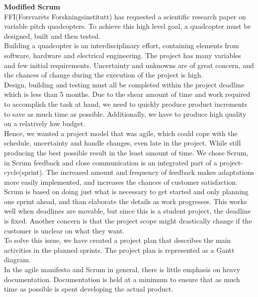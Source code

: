 \textbf{\LARGE Modified Scrum} \\
FFI(Forsvarets Forskningsinstitutt) has requested a scientific research paper on variable pitch quadcopters. To achieve this high level goal, a quadcopter must be designed, built and then tested.\\

Building a quadcopter is an interdisciplinary effort, containing elements from software, hardware and electrical engineering. The project has many variables and few initial requirements. Uncertainty and unknowns are of great concern, and the chances of change during the execution of the project is high. \\

Design, building and testing must all be completed within the project deadline which is less than 5 months. Due to the shear amount of time and work required to accomplish the task at hand, we need to quickly produce product increments to save as much time as possible. Additionally, we have to produce high quality on a relatively low budget.\\

Hence, we wanted a project model that was agile, which could cope with the schedule, uncertainty and handle changes, even late in the project. While still producing the best possible result in the least amount of time. We chose Scrum, in Scrum feedback and close communication is an integrated part of a project- cycle(sprint). The increased amount and frequency of feedback makes adaptations more easily implemented, and increases the chances of customer satisfaction.  \\

Scrum is based on doing just what is necessary to get started and only planning one sprint ahead, and than elaborate the details as work progresses. This works well when deadlines are movable, but since this is a student project, the deadline is fixed. Another concern is that the project scope might drastically change if the customer is unclear on what they want.\\

To solve this issue, we have created a project plan that describes the main activities in the planned sprints. The project plan is represented as a Gantt diagram.  \\

In the agile manifesto and Scrum in general, there is little emphasis on heavy documentation. Documentation is held at a minimum to ensure that as much time as possible is spent developing the actual product. \\

